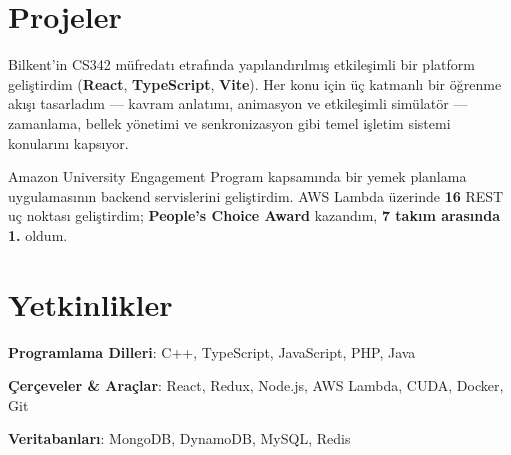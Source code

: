 \section{Projeler}
  \resumeSubHeadingListStart

{Bilkent'in CS342 müfredatı etrafında yapılandırılmış etkileşimli bir platform geliştirdim (\textbf{React}, \textbf{TypeScript}, \textbf{Vite}).}
\resumeItemListStart
    {Her konu için üç katmanlı bir öğrenme akışı tasarladım — kavram anlatımı, animasyon ve etkileşimli simülatör — zamanlama, bellek yönetimi ve senkronizasyon gibi temel işletim sistemi konularını kapsıyor.}
\resumeItemListEnd

{Amazon University Engagement Program kapsamında bir yemek planlama uygulamasının backend servislerini geliştirdim.}
\resumeItemListStart
    {AWS Lambda üzerinde \textbf{16} REST uç noktası geliştirdim; \textbf{People's Choice Award} kazandım, \textbf{7 takım arasında 1.} oldum.}
\resumeItemListEnd

  \resumeSubHeadingListEnd


\section{Yetkinlikler}
 \resumeSubHeadingListStart
    \item{
      \textbf{Programlama Dilleri}{: C++, TypeScript, JavaScript, PHP, Java}
    }
    \item{
      \textbf{Çerçeveler \& Araçlar}{: React, Redux, Node.js, AWS Lambda, CUDA, Docker, Git}
    }
    \item{
      \textbf{Veritabanları}{: MongoDB, DynamoDB, MySQL, Redis}
    }

 \resumeSubHeadingListEnd




